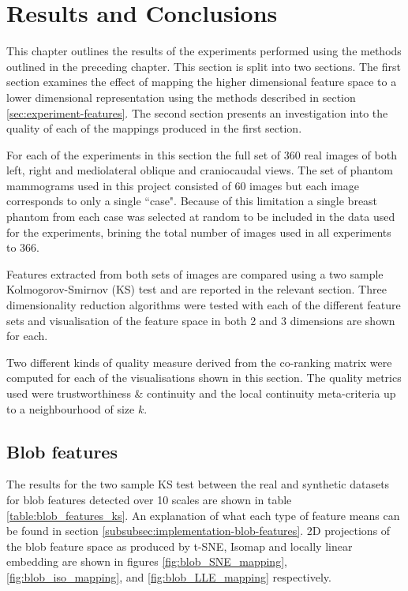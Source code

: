 \chapter{Results and Conclusions}
\label{chap:results}

This chapter outlines the results of the experiments performed using the methods outlined in the preceding chapter. This section is split into two sections. The first section examines the effect of mapping the higher dimensional feature space to a lower dimensional representation using the methods described in section \ref{sec:experiment-features}. The second section presents an investigation into the quality of each of the mappings produced in the first section.

For each of the experiments in this section the full set of 360 real images of both left, right and mediolateral oblique and craniocaudal views. The set of phantom mammograms used in this project consisted of 60 images but each image corresponds to only a single ``case". Because of this limitation a single breast phantom from each case was selected at random to be included in the data used for the experiments, brining the total number of images used in all experiments to 366.

Features extracted from both sets of images are compared using a two sample Kolmogorov-Smirnov (KS) test and are reported in the relevant section. Three dimensionality reduction algorithms were tested with each of the different feature sets and visualisation of the feature space in both 2 and 3 dimensions are shown for each.

Two different kinds of quality measure derived from the co-ranking matrix were computed for each of the visualisations shown in this section. The quality metrics used were trustworthiness \& continuity and the local continuity meta-criteria up to a neighbourhood of size $k$.

\section{Blob features} 
The results for the two sample KS test between the real and synthetic datasets for blob features detected over 10 scales are shown in table \ref{table:blob_features_ks}. An explanation of what each type of feature means can be found in section \ref{subsubsec:implementation-blob-features}. 2D projections of the blob feature space as produced by t-SNE, Isomap and locally linear embedding are shown in figures \ref{fig:blob_SNE_mapping}, \ref{fig:blob_iso_mapping}, and \ref{fig:blob_LLE_mapping} respectively. 

